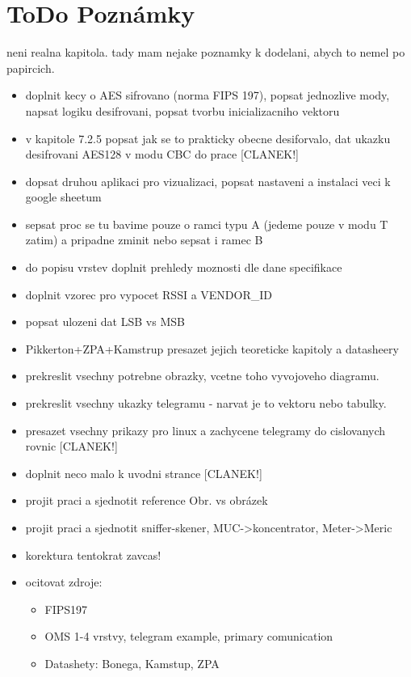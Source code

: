 \chapter{ToDo Poznámky}

\colorbox[rgb]{0,1,0}{neni realna kapitola. tady mam nejake poznamky k dodelani, abych to nemel po papircich.}

\begin{itemize}
	\item doplnit kecy o AES sifrovano (norma FIPS 197), popsat jednozlive mody, napsat logiku desifrovani, popsat tvorbu inicializacniho vektoru
	\item v kapitole 7.2.5 popsat jak se to prakticky obecne desiforvalo, dat ukazku desifrovani AES128 v modu CBC do prace [CLANEK!]
	\item dopsat druhou aplikaci pro vizualizaci, popsat nastaveni a instalaci veci k google sheetum
	\item sepsat proc se tu bavime pouze o ramci typu A (jedeme pouze v modu T zatim) a pripadne zminit nebo sepsat i ramec B
	\item do popisu vrstev doplnit prehledy moznosti dle dane specifikace
	\item doplnit vzorec pro vypocet RSSI a VENDOR\_ID
	\item popsat ulozeni dat LSB vs MSB
	\item Pikkerton+ZPA+Kamstrup presazet jejich teoreticke kapitoly a datasheery
	\item prekreslit vsechny potrebne obrazky, vcetne toho vyvojoveho diagramu. 
	\item prekreslit vsechny ukazky telegramu - narvat je to vektoru nebo tabulky.
	\item presazet vsechny prikazy pro linux a zachycene telegramy do cislovanych rovnic [CLANEK!]
	\item doplnit neco malo k uvodni strance [CLANEK!]
	\item projit praci a sjednotit reference Obr. vs obrázek
	\item projit praci a sjednotit sniffer-skener, MUC->koncentrator, Meter->Meric
	\item korektura tentokrat zavcas!
	\item ocitovat zdroje:
		\begin{itemize}
			\item FIPS197
			\item OMS 1-4 vrstvy, telegram example, primary comunication
			\item Datashety: Bonega, Kamstup, ZPA
		\end{itemize}
\end{itemize}
